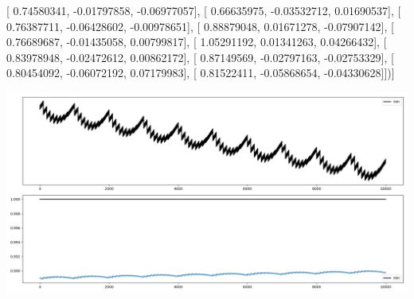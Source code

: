 \documentclass{article}
\begin{document}
       [ 0.74580341, -0.01797858, -0.06977057],
       [ 0.66635975, -0.03532712,  0.01690537],
       [ 0.76387711, -0.06428602, -0.00978651],
       [ 0.88879048,  0.01671278, -0.07907142],
       [ 0.76689687, -0.01435058,  0.00799817],
       [ 1.05291192,  0.01341263,  0.04266432],
       [ 0.83978948, -0.02472612,  0.00862172],
       [ 0.87149569, -0.02797163, -0.02753329],
       [ 0.80454092, -0.06072192,  0.07179983],
       [ 0.81522411, -0.05868654, -0.04330628]])]
\begin{center}
\includegraphics[scale=.9]{report_pickled_controls33/control_dpn_all}

\end{center}
\end{document}
